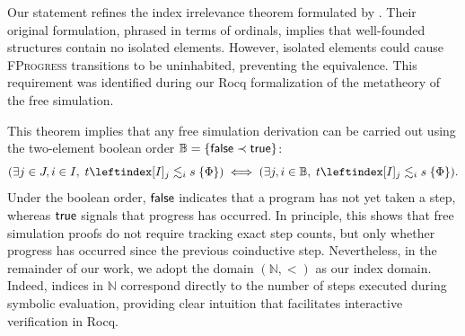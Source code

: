 \documentclass[report.tex]{subfiles}
\begin{document}
Our statement refines the index irrelevance theorem
formulated by \textcite{cho-23-stuttering}.
Their original formulation,
phrased in terms of ordinals,
implies that well-founded structures
contain no isolated elements.
However,
isolated elements could cause \textsc{FProgress}
transitions to be uninhabited,
preventing the equivalence.
This requirement was identified
during our Rocq formalization of the metatheory of the free simulation.

This theorem implies that any free simulation derivation
can be carried out using the two-element boolean order
$\mathbb{B} = \{\textsf{false} \prec \textsf{true}\}$:
\begin{equation*}
  (\exists j \in J, i \in I,\; \fsim{t}{j}{i}{s}{\Phi})
  \iff
  (\exists j, i \in \mathbb{B},\; \fsim{t}{j}{i}{s}{\Phi}).
\end{equation*}
Under the boolean order,
$\textsf{false}$ indicates that a program has not yet taken a step,
whereas $\textsf{true}$ signals that progress has occurred.
In principle,
this shows that free simulation proofs
do not require tracking exact step counts,
but only whether progress has occurred
since the previous coinductive step.
Nevertheless,
in the remainder of our work,
we adopt the domain $(\mathbb{N}, <)$
as our index domain.
Indeed,
indices in $\mathbb{N}$ correspond directly
to the number of steps executed during symbolic evaluation,
providing clear intuition that facilitates
interactive verification in Rocq.
\end{document}
